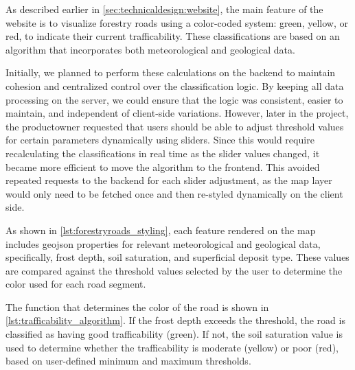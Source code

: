 As described earlier in \autoref{sec:technicaldesign:website}, the main feature of the website is to visualize forestry roads using a color-coded system: green, yellow, or red, to indicate their current trafficability.
These classifications are based on an algorithm that incorporates both meteorological and geological data.

Initially, we planned to perform these calculations on the backend to maintain cohesion and centralized control over the classification logic. By keeping all data processing on the server, we could ensure that the logic was consistent, easier to maintain, and independent of client-side variations. However, later in the project, the \gls{productowner} requested that users should be able to adjust threshold values for certain parameters dynamically using sliders. Since this would require recalculating the classifications in real time as the slider values changed, it became more efficient to move the algorithm to the frontend. This avoided repeated requests to the backend for each slider adjustment, as the map layer would only need to be fetched once and then re-styled dynamically on the client side.

As shown in \autoref{lst:forestryroads_styling}, each feature rendered on the map includes \gls{geojson} properties for relevant meteorological and geological data, specifically, frost depth, soil saturation, and superficial deposit type. These values are compared against the threshold values selected by the user to determine the color used for each road segment.

The function that determines the color of the road is shown in \autoref{lst:trafficability_algorithm}. If the frost depth exceeds the threshold, the road is classified as having good trafficability (green). If not, the soil saturation value is used to determine whether the trafficability is moderate (yellow) or poor (red), based on user-defined minimum and maximum thresholds.

\begin{figure}[h]

\end{figure}

\begin{figure}[h]

\end{figure}

